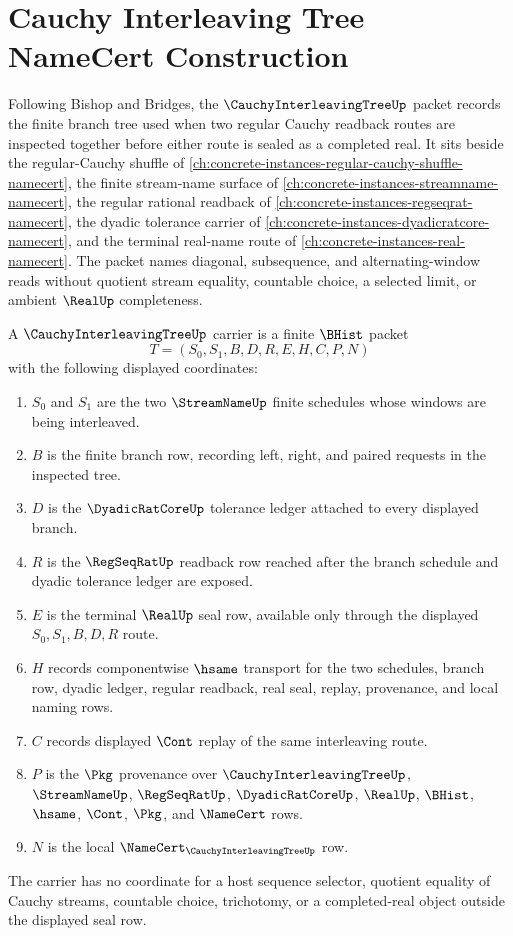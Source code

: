 \chapter{Cauchy Interleaving Tree NameCert Construction}
\label{ch:concrete-instances-cauchy-interleaving-tree-namecert}

Following Bishop and Bridges, the $\CauchyInterleavingTreeUp$ packet records the finite branch tree used when two regular Cauchy readback routes are inspected together before either route is sealed as a completed real. It sits beside the regular-Cauchy shuffle of \autoref{ch:concrete-instances-regular-cauchy-shuffle-namecert}, the finite stream-name surface of \autoref{ch:concrete-instances-streamname-namecert}, the regular rational readback of \autoref{ch:concrete-instances-regseqrat-namecert}, the dyadic tolerance carrier of \autoref{ch:concrete-instances-dyadicratcore-namecert}, and the terminal real-name route of \autoref{ch:concrete-instances-real-namecert}. The packet names diagonal, subsequence, and alternating-window reads without quotient stream equality, countable choice, a selected limit, or ambient $\RealUp$ completeness.

\begin{definition}
\label{def:cauchy-interleaving-tree-carrier}
A $\CauchyInterleavingTreeUp$ carrier is a finite $\BHist$ packet
$$
T=(S_0,S_1,B,D,R,E,H,C,P,N)
$$
with the following displayed coordinates:
\begin{enumerate}
\item $S_0$ and $S_1$ are the two $\StreamNameUp$ finite schedules whose windows are being interleaved.
\item $B$ is the finite branch row, recording left, right, and paired requests in the inspected tree.
\item $D$ is the $\DyadicRatCoreUp$ tolerance ledger attached to every displayed branch.
\item $R$ is the $\RegSeqRatUp$ readback row reached after the branch schedule and dyadic tolerance ledger are exposed.
\item $E$ is the terminal $\RealUp$ seal row, available only through the displayed $S_0,S_1,B,D,R$ route.
\item $H$ records componentwise $\hsame$ transport for the two schedules, branch row, dyadic ledger, regular readback, real seal, replay, provenance, and local naming rows.
\item $C$ records displayed $\Cont$ replay of the same interleaving route.
\item $P$ is the $\Pkg$ provenance over $\CauchyInterleavingTreeUp$, $\StreamNameUp$, $\RegSeqRatUp$, $\DyadicRatCoreUp$, $\RealUp$, $\BHist$, $\hsame$, $\Cont$, $\Pkg$, and $\NameCert$ rows.
\item $N$ is the local $\NameCert_{\CauchyInterleavingTreeUp}$ row.
\end{enumerate}
The carrier has no coordinate for a host sequence selector, quotient equality of Cauchy streams, countable choice, trichotomy, or a completed-real object outside the displayed seal row.
\end{definition}

